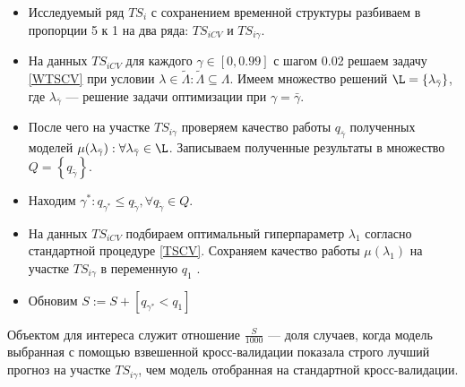 \documentclass[a4paper, 14pt]{article}
\begin{document}
\begin{itemize} \label{desc: WTSCV}
	\item Исследуемый ряд $TS_i$ с сохранением временной структуры разбиваем в пропорции 5 к 1 на два ряда: $TS_{iCV}$ и $TS_{i\gamma}$.
	\item На данных $TS_{iCV}$ для каждого $\gamma \in \left[0, 0.99\right]$ с шагом 0.02 решаем задачу \eqref{WTSCV} при условии $\lambda \in \tilde{\Lambda} : \tilde{\Lambda} \subseteq \Lambda$. Имеем множество решений $\L = \left\{ \lambda_{\bar{\gamma}} \right\}$, где $\lambda_{\bar{\gamma}}$ --- решение задачи оптимизации при $\gamma = \bar{\gamma}$.
	\item После чего на участке $TS_{i\gamma}$ проверяем качество работы $q_{\bar{\gamma}}$ полученных моделей $\mu(\lambda_{\bar{\gamma}}) : \forall \lambda_{\bar{\gamma}} \in \L$. Записываем полученные результаты в множество $Q = \left\{q_{\bar{\gamma}}\right\}$.
	\item Находим $\gamma^* : q_{\gamma^*} \leq  q_{{\tilde{\gamma}}},   \forall q_{{\tilde{\gamma}}} \in Q$.
	\item На данных $TS_{iCV}$ подбираем оптимальный гиперпараметр $\lambda_{1}$ согласно стандартной процедуре \eqref{TSCV}. Сохраняем качество работы $\mu(\lambda_{1})$ на участке $TS_{i\gamma}$ в переменную $q_1$ .
	\item Обновим $S := S + \left[q_{\gamma^*} < q_1 \right]$
\end{itemize}

Объектом для интереса служит отношение $\frac{S}{1000}$ --- доля случаев, когда модель выбранная с помощью взвешенной кросс-валидации показала строго лучший прогноз на участке $TS_{i\gamma}$, чем модель отобранная на стандартной кросс-валидации.



\newpage
\end{document}
